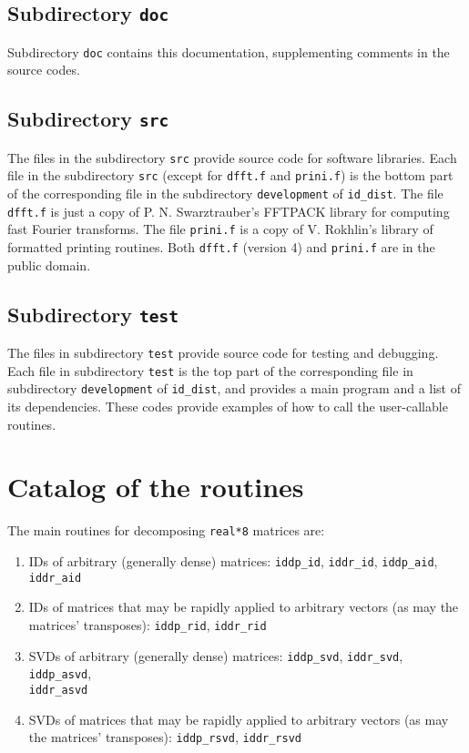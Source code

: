 \documentclass[letterpaper,12pt]{article}
\begin{document}
\subsection{Subdirectory {\tt doc}}

Subdirectory {\tt doc} contains this documentation,
supplementing comments in the source codes.


\subsection{Subdirectory {\tt src}}

The files in the subdirectory {\tt src} provide source code
for software libraries. Each file in the subdirectory {\tt src}
(except for {\tt dfft.f} and {\tt prini.f}) is
the bottom part of the corresponding file
in the subdirectory {\tt development} of {\tt id\_dist}.
The file {\tt dfft.f} is just a copy
of P. N. Swarztrauber's FFTPACK library
for computing fast Fourier transforms.
The file {\tt prini.f} is a copy of V. Rokhlin's library
of formatted printing routines.
Both {\tt dfft.f} (version 4) and {\tt prini.f} are in the public domain.


\subsection{Subdirectory {\tt test}}

The files in subdirectory {\tt test} provide source code
for testing and debugging. Each file in subdirectory {\tt test} is
the top part of the corresponding file
in subdirectory {\tt development} of {\tt id\_dist},
and provides a main program and a list of its dependencies.
These codes provide examples of how to call the user-callable routines.



\section{Catalog of the routines}

The main routines for decomposing {\tt real*8} matrices are:
%
\begin{enumerate}
%
\item IDs of arbitrary (generally dense) matrices:
{\tt iddp\_id}, {\tt iddr\_id}, {\tt iddp\_aid}, {\tt iddr\_aid}
%
\item IDs of matrices that may be rapidly applied to arbitrary vectors
(as may the matrices' transposes):
{\tt iddp\_rid}, {\tt iddr\_rid}
%
\item SVDs of arbitrary (generally dense) matrices:
{\tt iddp\_svd}, {\tt iddr\_svd}, {\tt iddp\_asvd},\\{\tt iddr\_asvd}
%
\item SVDs of matrices that may be rapidly applied to arbitrary vectors
(as may the matrices' transposes):
{\tt iddp\_rsvd}, {\tt iddr\_rsvd}
%
\end{enumerate}
\end{document}
